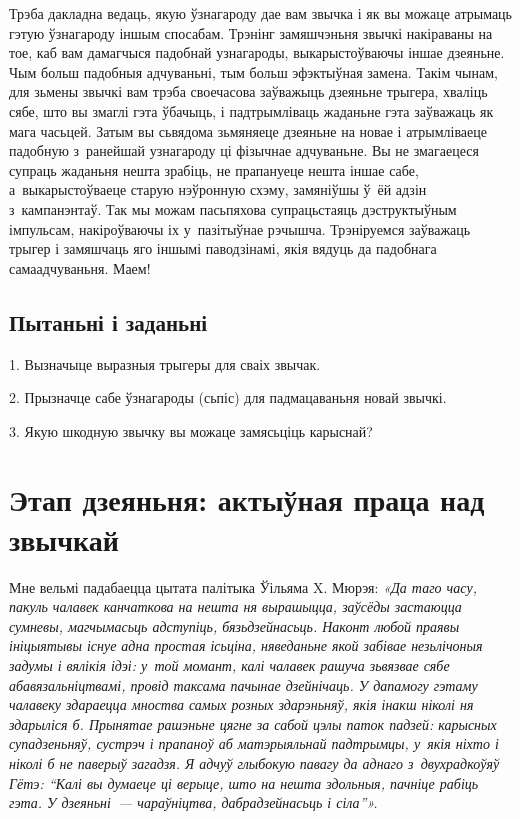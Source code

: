 Трэба дакладна ведаць, якую ўзнагароду дае вам звычка і як вы можаце атрымаць гэтую ўзнагароду іншым спосабам. Трэнінг замяшчэньня звычкі накіраваны на тое, каб вам дамагчыся падобнай узнагароды, выкарыстоўваючы іншае дзеяньне. Чым больш падобныя адчуваньні, тым больш эфэктыўная замена. Такім чынам, для зьмены звычкі вам трэба своечасова заўважыць дзеяньне трыгера, хваліць сябе, што вы змаглі гэта ўбачыць, і падтрымліваць жаданьне гэта заўважаць як мага часьцей. Затым вы сьвядома зьмяняеце дзеяньне на новае і атрымліваеце падобную з~ранейшай узнагароду ці фізычнае адчуваньне. Вы не змагаецеся супраць жаданьня нешта зрабіць, не прапануеце нешта іншае сабе, а~выкарыстоўваеце старую нэўронную схэму, замяніўшы ў~ёй адзін з~кампанэнтаў. Так мы можам пасьпяхова супрацьстаяць дэструктыўным імпульсам, накіроўваючы іх у~пазітыўнае рэчышча. Трэніруемся заўважаць трыгер і замяшчаць яго іншымі паводзінамі, якія вядуць да падобнага самаадчуваньня. Маем!

\subsection*{Пытаньні і заданьні}

1. Вызначыце выразныя трыгеры для сваіх звычак.

2. Прызначце сабе ўзнагароды (сьпіс) для падмацаваньня новай звычкі.

3. Якую шкодную звычку вы можаце замясьціць карыснай?


\section{Этап дзеяньня: актыўная праца над звычкай}

Мне вельмі падабаецца цытата палітыка Ўільяма X. Мюрэя: \emph{«Да таго часу, пакуль чалавек канчаткова на нешта ня вырашыцца, заўсёды застаюцца сумневы, магчымасьць адступіць, бязьдзейнасьць. Наконт любой праявы ініцыятывы існуе адна простая ісьціна, няведаньне якой забівае незьлічоныя задумы і вялікія ідэі: у~той момант, калі чалавек рашуча зьвязвае сябе абавязальніцтвамі, провід таксама пачынае дзейнічаць. У дапамогу гэтаму чалавеку здараецца мноства самых розных здарэньняў, якія інакш ніколі ня здарыліся б. Прынятае рашэньне цягне за сабой цэлы паток падзей: карысных супадзеньняў, сустрэч і прапаноў аб матэрыяльнай падтрымцы, у~якія ніхто і ніколі б не паверыў загадзя. Я адчуў глыбокую павагу да аднаго з~двухрадкоўяў Гётэ: ``Калі вы думаеце ці верыце, што на нешта здольныя, пачніце рабіць гэта. У дзеяньні~--- чараўніцтва, дабрадзейнасьць і сіла''».}

